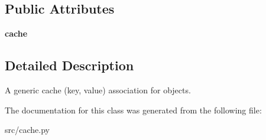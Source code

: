 \subsection*{Public Attributes}
\begin{DoxyCompactItemize}
\item 
\hypertarget{classsrc_1_1cache_1_1_global_cache_a1ccbd28f4abef4193400d308a2b0df23}{}\label{classsrc_1_1cache_1_1_global_cache_a1ccbd28f4abef4193400d308a2b0df23} 
{\bfseries cache}
\end{DoxyCompactItemize}


\subsection{Detailed Description}
\begin{DoxyVerb}A generic cache (key, value) association for objects.
\end{DoxyVerb}
 

The documentation for this class was generated from the following file\+:\begin{DoxyCompactItemize}
\item 
src/cache.\+py\end{DoxyCompactItemize}
